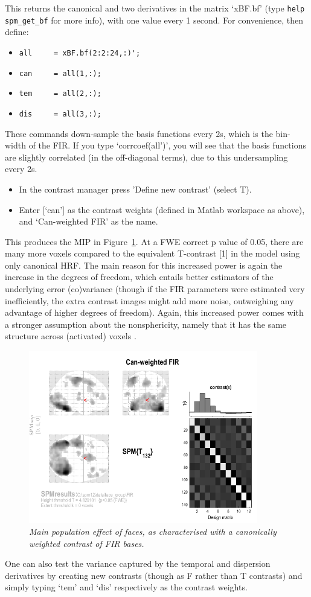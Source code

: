 \documentclass[a4paper,titlepage]{book}
\newcommand{\bi}{\begin{itemize}}
\newcommand{\ei}{\end{itemize}}
\begin{document}
This returns the canonical and two derivatives in the matrix `xBF.bf' (type \verb!help spm_get_bf! for more info), with one value every 1 second. For convenience, then define:
\bi
\item{\verb!all		= xBF.bf(2:2:24,:)';!}
\item{\verb!can 	= all(1,:);!}
\item{\verb!tem 	= all(2,:);!}
\item{\verb!dis 	= all(3,:);!}
\ei

These commands down-sample the basis functions every 2s, which is the bin-width of the FIR.
If you type `corrcoef(all')', you will see that the basis functions are slightly correlated (in the off-diagonal terms), due to this undersampling every 2s.
\bi
\item{In the contrast manager press 'Define new contrast' (select T).}
\item{Enter [`can'] as the contrast weights (defined in Matlab workspace as above), and `Can-weighted FIR' as the name.}
\ei
This produces the MIP in Figure~\ref{can_weighted_fir}. At a FWE correct p value of 0.05, there are many more voxels compared to the equivalent T-contrast [1] in the model using only canonical HRF. The main reason for this increased power is again the increase in the degrees of freedom, which entails better estimators of the underlying error (co)variance (though if the FIR parameters were estimated very inefficiently, the extra contrast images might add more noise, outweighing any advantage of higher degrees of freedom). Again, this increased power comes with a stronger assumption about the nonsphericity, namely that it has the same structure across (activated) voxels \cite{daniel_hbf2}.
\begin{figure}
\begin{center}
\includegraphics[width=100mm]{faces_group/can_weighted_fir}
\caption{\em Main population effect of faces, as characterised with a canonically weighted contrast of FIR bases. \label{can_weighted_fir}}
\end{center}
\end{figure}
One can also test the variance captured by the temporal and dispersion derivatives by creating new contrasts (though as F rather than T contrasts) and simply typing `tem' and `dis' respectively as the contrast weights.
\end{document}
